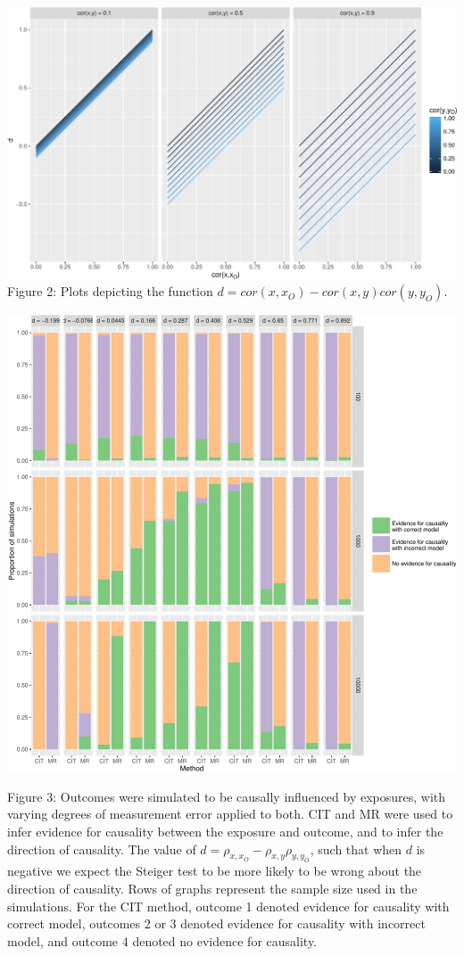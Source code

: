 \documentclass[]{article}
\begin{document}
\newpage

\includegraphics{manuscript_files/figure-latex/d_relationship_figure-1.pdf}\\
Figure 2: Plots depicting the function
\(d = cor(x, x_O) - cor(x,y)cor(y, y_O)\).

\newpage

\includegraphics{manuscript_files/figure-latex/cit_mr_comparison_figure-1.pdf}

Figure 3: Outcomes were simulated to be causally influenced by
exposures, with varying degrees of measurement error applied to both.
CIT and MR were used to infer evidence for causality between the
exposure and outcome, and to infer the direction of causality. The value
of \(d = \rho_{x, x_O} - \rho_{x,y}\rho_{y,y_O}\), such that when \(d\)
is negative we expect the Steiger test to be more likely to be wrong
about the direction of causality. Rows of graphs represent the sample
size used in the simulations. For the CIT method, outcome 1 denoted
evidence for causality with correct model, outcomes 2 or 3 denoted
evidence for causality with incorrect model, and outcome 4 denoted no
evidence for causality.
\end{document}
